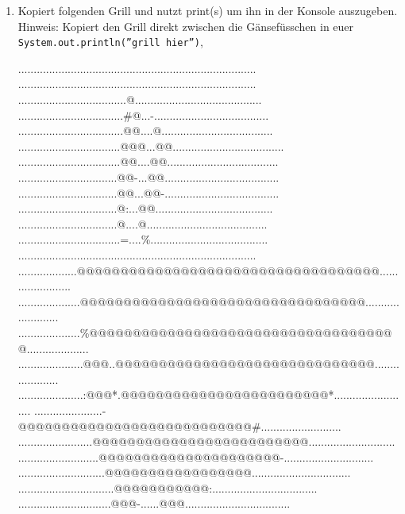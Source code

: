 \documentclass{../../sheet}
\begin{document}
\begin{enumerate}
    \item Kopiert folgenden Grill und nutzt print(s) um ihn in der Konsole auszugeben.\\
    Hinweis: Kopiert den Grill direkt zwischen die Gänsefüsschen in euer \texttt{System.out.println(''grill hier'')},  
          \begin{ausgabe}
              .............................................................................
              .............................................................................
              ...................................@.........................................
              ..................................\#@...-.....................................
              ..................................@@....@....................................
              .................................@@@...@@....................................
              .................................@@....@@....................................
              ................................@@-...@@.....................................
              ................................@@...@@-.....................................
              ................................@:...@@......................................
              ................................@....@.......................................
              .................................=....\%......................................
              .............................................................................
              ...................@@@@@@@@@@@@@@@@@@@@@@@@@@@@@@@@@@@.......................
              ....................@@@@@@@@@@@@@@@@@@@@@@@@@@@@@@@@@........................
              ....................\%@@@@@@@@@@@@@@@@@@@@@@@@@@@@@@@@@@@@....................
              .....................@@@..@@@@@@@@@@@@@@@@@@@@@@@@@@@@@@.....................
              .....................:@@@*.@@@@@@@@@@@@@@@@@@@@@@@@*.........................
              ......................-@@@@@@@@@@@@@@@@@@@@@@@@@@@\#..........................
              ........................@@@@@@@@@@@@@@@@@@@@@@@@@............................
              ..........................@@@@@@@@@@@@@@@@@@@@@-.............................
              ............................@@@@@@@@@@@@@@@@@................................
              ...............................@@@@@@@@@@@:..................................
              ..............................@@@-......@@@..................................

\end{ausgabe}
\end{enumerate}
\end{document}

